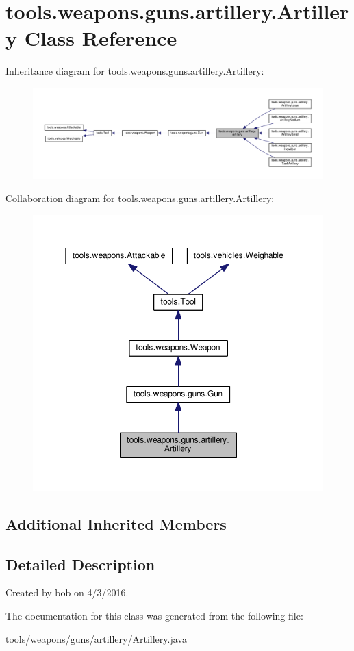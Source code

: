 \hypertarget{classtools_1_1weapons_1_1guns_1_1artillery_1_1_artillery}{}\section{tools.\+weapons.\+guns.\+artillery.\+Artillery Class Reference}
\label{classtools_1_1weapons_1_1guns_1_1artillery_1_1_artillery}


Inheritance diagram for tools.\+weapons.\+guns.\+artillery.\+Artillery\+:
\nopagebreak
\begin{figure}[H]
\begin{center}
\leavevmode
\includegraphics[width=350pt]{classtools_1_1weapons_1_1guns_1_1artillery_1_1_artillery__inherit__graph}
\end{center}
\end{figure}


Collaboration diagram for tools.\+weapons.\+guns.\+artillery.\+Artillery\+:
\nopagebreak
\begin{figure}[H]
\begin{center}
\leavevmode
\includegraphics[width=350pt]{classtools_1_1weapons_1_1guns_1_1artillery_1_1_artillery__coll__graph}
\end{center}
\end{figure}
\subsection*{Additional Inherited Members}


\subsection{Detailed Description}
Created by bob on 4/3/2016. 

The documentation for this class was generated from the following file\+:\begin{DoxyCompactItemize}
\item 
tools/weapons/guns/artillery/Artillery.\+java\end{DoxyCompactItemize}
